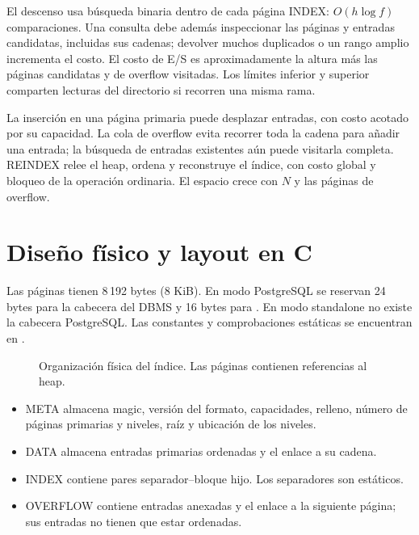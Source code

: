 \documentclass[11pt,a4paper]{article}
\newcommand{\code}[1]{\texttt{\detokenize{#1}}}
\begin{document}
El descenso usa búsqueda binaria dentro de cada página INDEX: $O(h\log f)$
comparaciones. Una consulta debe además inspeccionar las páginas y entradas
candidatas, incluidas sus cadenas; devolver muchos duplicados o un rango amplio
incrementa el costo. El costo de E/S es aproximadamente la altura más las páginas
candidatas y de overflow visitadas. Los límites inferior y superior comparten
lecturas del directorio si recorren una misma rama.

La inserción en una página primaria puede desplazar entradas, con costo acotado
por su capacidad. La cola de overflow evita recorrer toda la cadena para añadir
una entrada; la búsqueda de entradas existentes aún puede visitarla completa.
REINDEX relee el heap, ordena y reconstruye el índice, con costo global y bloqueo
de la operación ordinaria. El espacio crece con $N$ y las páginas de overflow.

\section{Diseño físico y layout en C}

Las páginas tienen 8\,192 bytes (8 KiB). En modo PostgreSQL se reservan 24 bytes
para la cabecera del DBMS y 16 bytes para \code{IsamBlockHeader}. En modo
standalone no existe la cabecera PostgreSQL. Las constantes y comprobaciones
estáticas se encuentran en \code{isam_am/core/isam_layout.h}.

\begin{figure}[htbp]
\centering
{}
\caption{Organización física del índice. Las páginas contienen referencias al heap.}
\end{figure}

\begin{itemize}
\item META almacena magic, versión del formato, capacidades, relleno, número de
páginas primarias y niveles, raíz y ubicación de los niveles.
\item DATA almacena entradas primarias ordenadas y el enlace a su cadena.
\item INDEX contiene pares separador--bloque hijo. Los separadores son estáticos.
\item OVERFLOW contiene entradas anexadas y el enlace a la siguiente página;
sus entradas no tienen que estar ordenadas.
\end{itemize}
\end{document}

